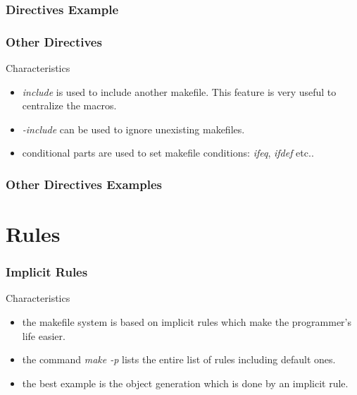 \documentclass{beamer}
\begin{document}

\begin{frame}
  \frametitle{Directives Example}

  \begin{Example}
    
  \end{Example}

\end{frame}


\begin{frame}
  \frametitle{Other Directives}

  \begin{block}{Characteristics}
    \begin{itemize}
      \item
        \textit{include} is used to include another makefile. This feature
        is very useful to centralize the macros.
      \item
        \textit{-include} can be used to ignore unexisting makefiles.
      \item
        conditional parts are used to set makefile conditions:
        \textit{ifeq}, \textit{ifdef} etc..
    \end{itemize}
  \end{block}

\end{frame}


\begin{frame}
  \frametitle{Other Directives Examples}

  \begin{Example}
    
  \end{Example}

\end{frame}

%
%

\section{Rules}


\begin{frame}
  \frametitle{Implicit Rules}

  \begin{block}{Characteristics}
    \begin{itemize}
      \item<1->
        the makefile system is based on implicit rules which make the
        programmer's life easier.
      \item<1->
        the command \textit{make -p} lists the entire list of rules including
        default ones.
      \item<1->
        the best example is the object generation which is done by an implicit
        rule.
    \end{itemize}
  \end{block}

\end{frame}
\end{document}
